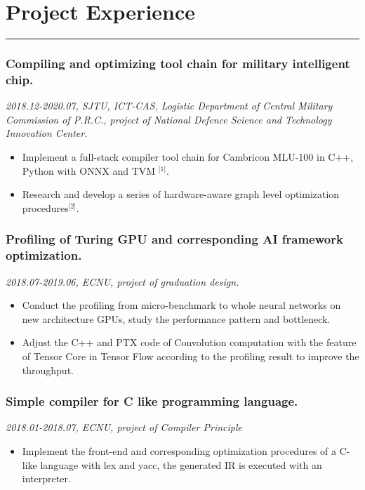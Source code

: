 \documentclass[twocolumn, 9pt]{article}
\begin{document}
		\section*{{\EBITC Project Experience}\vspace{-1.2em}}
		\noindent
		\rule[0.01em]{\linewidth}{0.01em}
		\subsubsection*{Compiling and optimizing tool chain for military intelligent chip.}
		\emph{2018.12-2020.07, SJTU, ICT-CAS, Logistic Department of Central Military Commission of P.R.C., project of National Defence Science and Technology Innovation Center.}
		\begin{itemize}
		\item Implement a full-stack compiler tool chain for Cambricon MLU-100 in {\courier C++, Python} with {\courier ONNX} and {\courier TVM} $ ^{\lbrack 1\rbrack} $.
		\item Research and develop a series of hardware-aware graph level optimization procedures$ ^{\lbrack 2\rbrack} $. 
		\end{itemize}
        \subsubsection*{Profiling of Turing GPU and corresponding AI framework optimization.}
		\emph{2018.07-2019.06, ECNU, project of graduation design.}
		\begin{itemize}
		\item Conduct the profiling from micro-benchmark to whole neural networks on new architecture GPUs, study the performance pattern and bottleneck.
		\item Adjust the {\courier C++} and {\courier PTX} code of Convolution computation with the feature of Tensor Core in {\courier Tensor Flow} according to the profiling result to improve the throughput.
		\end{itemize}
		\subsubsection*{Simple compiler for C like programming language.}
		\emph{2018.01-2018.07, ECNU, project of Compiler Principle}
		\begin{itemize}
		\item Implement the front-end and corresponding optimization procedures of a C-like language with {\courier lex} and {\courier yacc}, the generated IR is executed with an interpreter. 
		\end{itemize}
\end{document}
